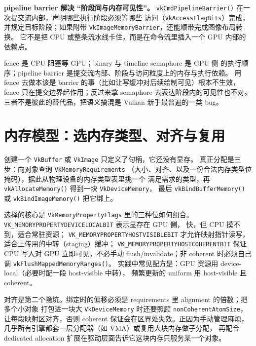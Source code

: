 \documentclass[12pt,a4paper,fontset=fandol]{ctexbook}
\newcommand{\Fn}[1]{\texttt{#1()}}
\newcommand{\Tp}[1]{\texttt{#1}}
\newcommand{\Bk}{\discretionary{}{}{}}
\newcommand{\Lang}[1]{\textsf{#1}}
\newcommand{\DomCPU}{\Lang{CPU}}
\newcommand{\DomGPU}{\Lang{GPU}}
\begin{document}
\textbf{pipeline barrier 解决 ``阶段间与内存可见性''。}
\Fn{vkCmd\Bk Pipeline\Bk Barrier} 在一次提交流内部，声明哪些执行阶段必须等哪些
访问（\Tp{Vk\Bk Access\Bk Flag\Bk Bits}）完成，并规定目标阶段；如果附带
\Tp{Vk\Bk Image\Bk Memory\Bk Barrier}，还能顺带完成图像布局转换。
它不是把 \DomCPU{} 或整条流水线卡住，而是在命令流里插入一个 \DomGPU{} 内部的依赖点。

\begin{warning}[title={三者语义别混}]
fence 是 \DomCPU{} 阻塞等 \DomGPU{}；binary 与 timeline semaphore 是 \DomGPU{} 侧
的执行顺序；pipeline barrier 是提交流内部、阶段与访问粒度上的内存与执行依赖。
用 fence 去做本该是 barrier 的事（比如让写缓冲对后续绘制可见）根本不生效，
fence 只在提交边界起作用；反过来拿 semaphore 去表达阶段内的可见性也不对。
三者不是彼此的替代品，把语义搞混是 Vulkan 新手最普遍的一类 bug。
\end{warning}

\section{内存模型：选内存类型、对齐与复用}

创建一个 \Tp{VkBuffer} 或 \Tp{VkImage} 只定义了句柄，它还没有显存。
真正分配是三步：向对象查询 \Tp{Vk\Bk Memory\Bk Requirements}
（大小、对齐、以及一份合法内存类型位掩码），据此从物理设备的内存类型表里挑一个
满足需求的类型，再 \Fn{vkAllocate\Bk Memory} 得到一块 \Tp{VkDevice\Bk Memory}，
最后 \Fn{vkBind\Bk Buffer\Bk Memory} 或 \Fn{vkBind\Bk Image\Bk Memory} 把它绑上。

选择的核心是 \Tp{Vk\Bk Memory\Bk Property\Bk Flags} 里的三种位如何组合。
\Tp{VK\_{\Bk}MEMORY\Bk PROPERTY\Bk DEVICE\Bk LOCAL\Bk BIT} 表示显存在 \DomGPU{} 侧，
快，但 \DomCPU{} 摸不到，适合常驻资源；
\Tp{VK\_{\Bk}MEMORY\Bk PROPERTY\Bk HOST\Bk VISIBLE\Bk BIT} 才允许映射指针读写，
适合上传用的中转（staging）缓冲；
\Tp{VK\_{\Bk}MEMORY\Bk PROPERTY\Bk HOST\Bk COHERENT\Bk BIT} 保证 \DomCPU{} 写入对
\DomGPU{} 立即可见，不必手动 flush/{\Bk}invalidate；非 coherent 时必须自己调
\Fn{vk{\Bk}Flush\Bk Mapped\Bk Memory\Bk Ranges}。
实践中常见配方是：\DomGPU{} 资源用 device-local（必要时配一段 host-visible 中转），
频繁更新的 uniform 用 host-visible 且 coherent。

对齐是第二个隐坑。绑定时的偏移必须是 requirements 里 alignment 的倍数；把多个小对象
打包进一块大 \Tp{VkDevice\Bk Memory} 时还要照顾 \Tp{non\Bk Coherent\Bk Atom\Bk Size}，
让每段映射区对齐，否则 coherent 保证会在区界处失效。正因为手动管理麻烦，
几乎所有引擎都套一层分配器（如 VMA）或复用大块内存做子分配，
再配合 dedicated allocation 扩展在驱动层面告诉它这块内存只服务某一个对象。
\end{document}
